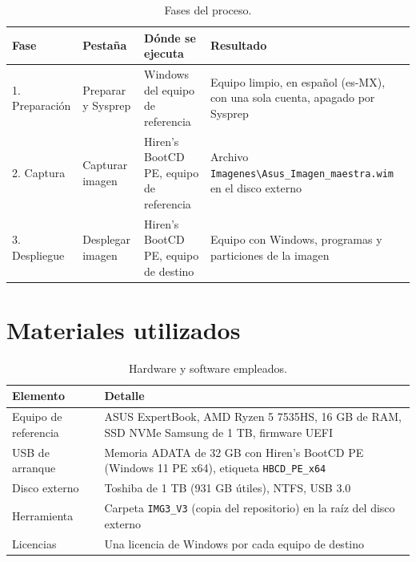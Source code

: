 \documentclass[11pt,a4paper]{report}
\newcommand{\bs}{\textbackslash\allowbreak{}}
\begin{document}
\begin{table}[H]
  \centering
  \small
  \begin{tabularx}{\textwidth}{@{}l l l >{\raggedright\arraybackslash}X@{}}
    \toprule
    \textbf{Fase} & \textbf{Pestaña} & \textbf{Dónde se ejecuta} & \textbf{Resultado} \\
    \midrule
    1. Preparación & Preparar y Sysprep & Windows del equipo de referencia &
      Equipo limpio, en español (es-MX), con una sola cuenta, apagado por Sysprep \\
    2. Captura & Capturar imagen & Hiren's BootCD PE, equipo de referencia &
      Archivo \texttt{Imagenes\bs Asus\_\allowbreak Imagen\_\allowbreak maestra.wim} en el disco externo \\
    3. Despliegue & Desplegar imagen & Hiren's BootCD PE, equipo de destino &
      Equipo con Windows, programas y particiones de la imagen \\
    \bottomrule
  \end{tabularx}
  \caption{Fases del proceso.}
\end{table}

\section{Materiales utilizados}

\begin{table}[H]
  \centering
  \small
  \begin{tabularx}{\textwidth}{@{}l X@{}}
    \toprule
    \textbf{Elemento} & \textbf{Detalle} \\
    \midrule
    Equipo de referencia & ASUS ExpertBook, AMD Ryzen 5 7535HS, 16 GB de RAM,
      SSD NVMe Samsung de 1 TB, firmware UEFI \\
    USB de arranque & Memoria ADATA de 32 GB con Hiren's BootCD PE (Windows 11 PE x64),
      etiqueta \texttt{HBCD\_PE\_x64} \\
    Disco externo & Toshiba de 1 TB (931 GB útiles), NTFS, USB 3.0 \\
    Herramienta & Carpeta \texttt{IMG3\_V3} (copia del repositorio) en la raíz del disco externo \\
    Licencias & Una licencia de Windows por cada equipo de destino \\
    \bottomrule
  \end{tabularx}
  \caption{Hardware y software empleados.}
\end{table}
\end{document}
